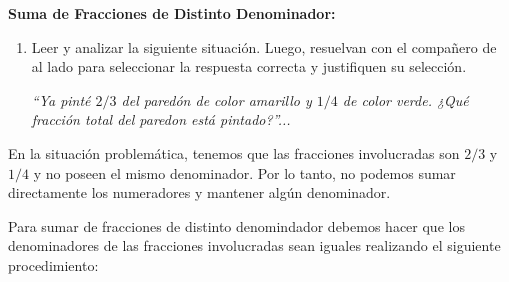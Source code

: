 \documentclass[12pt]{examdesign}
\theoremstyle{plain}
\theoremstyle{definition}
\theoremstyle{remark}
\begin{document}
	\begin{endmatter}
		\centerline{\LARGE \textcolor{upforestgreen}{\textbf{Suma de Fracciones de Distinto Denominador:}}}
		\vspace{.4cm}
		\begin{tcolorbox}[colback=red!10!white, colframe=tealgreen, title=\textit{Para pensar!...}]
			\begin{enumerate}%
				\item Leer y analizar la siguiente situación. Luego, resuelvan con el compañero de al lado para seleccionar la respuesta correcta y justifiquen su selección.
				\begin{center}%
					\textit{``Ya pinté $2/3$ del paredón de color amarillo y $1/4$ de color verde. ¿Qué fracción total del paredon está pintado?''...}
				\end{center}%
			\end{enumerate}%
		\end{tcolorbox}
		
		En la situación problemática, tenemos que las fracciones involucradas son $2/3$ y $1/4$ y no poseen el mismo denominador. Por lo tanto, no podemos sumar directamente los numeradores y mantener algún denominador.
		
		Para sumar de fracciones de distinto denomindador debemos hacer que los denominadores de las fracciones involucradas sean iguales realizando el siguiente procedimiento:
		

\end{endmatter}
\end{document}
